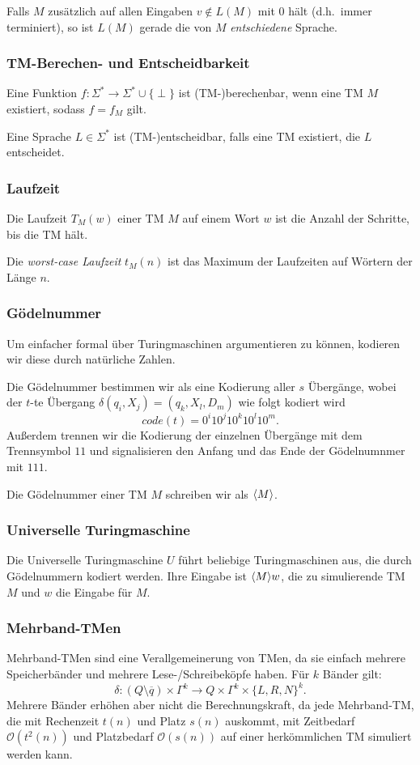 \documentclass[a4paper,parskip=half*,DIV=7,fontsize=11pt]{scrartcl}
\DeclarePairedDelimiter\goedel{\langle}{\rangle}
\begin{document}
Falls $M$ zusätzlich auf allen Eingaben $v \notin L(M)$ mit 0 hält (d.h.\ immer terminiert), so ist $L(M)$ gerade die von $M$ \emph{entschiedene} Sprache.

\subsubsection{TM-Berechen- und Entscheidbarkeit}
Eine Funktion $f : \Sigma^* \to \Sigma^* \cup \{\perp\}$ ist (TM-)berechenbar, wenn eine TM $M$ existiert, sodass $f = f_M$ gilt.

Eine Sprache $L \in \Sigma^*$ ist (TM-)entscheidbar, falls eine TM existiert, die $L$ entscheidet.

\subsubsection{Laufzeit}

Die Laufzeit $T_M(w)$ einer TM $M$ auf einem Wort $w$ ist die Anzahl der Schritte, bis die TM hält.

Die \emph{worst-case Laufzeit} $t_M(n)$ ist das Maximum der Laufzeiten auf Wörtern der Länge $n$.

\subsubsection{Gödelnummer}
Um einfacher formal über Turingmaschinen argumentieren zu können, kodieren wir diese durch natürliche Zahlen.

Die Gödelnummer bestimmen wir als eine Kodierung aller $s$ Übergänge, wobei der $t$-te Übergang $\delta(q_i, X_j) = (q_k, X_l, D_m)$ wie folgt kodiert wird $$code(t) = 0^i 10^j 10^k 10^l 10^m.$$ Außerdem trennen wir die Kodierung der einzelnen Übergänge mit dem Trennsymbol $11$ und signalisieren den Anfang und das Ende der Gödelnumnmer mit $111$.

Die Gödelnummer einer TM $M$ schreiben wir als $\goedel{M}$.

\subsubsection{Universelle Turingmaschine}
Die Universelle Turingmaschine $U$ führt beliebige Turingmaschinen aus, die durch Gödelnummern kodiert werden. Ihre Eingabe ist $\goedel{M} w$, die zu simulierende TM $M$ und $w$ die Eingabe für $M$.

\subsubsection{Mehrband-TMen}
Mehrband-TMen sind eine Verallgemeinerung von TMen, da sie einfach mehrere Speicherbänder und mehrere Lese-/Schreibeköpfe haben. Für $k$ Bänder gilt: 
\[\delta : (Q \setminus \overline{q}) \times \Gamma^k \to Q \times \Gamma^k \times \{L,R,N\}^k.\]
Mehrere Bänder erhöhen aber nicht die Berechnungskraft, da jede Mehrband-TM, die mit Rechenzeit $t(n)$ und Platz $s(n)$ auskommt, mit Zeitbedarf $\mathcal{O}(t^2(n))$ und Platzbedarf $\mathcal{O}(s(n))$ auf einer herkömmlichen TM simuliert werden kann. 
\end{document}
